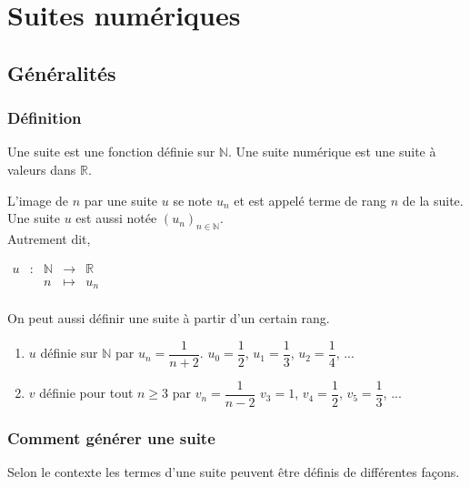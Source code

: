 \documentclass[french]{book}
\newcommand{\R}{\mathbb {R}}
\newcommand{\N}{\mathbb {N}}
\newcommand{\se}{\geq}
\newcommand{\suite}[1][u]{\left( #1_{n} \right)_{n\in\N}}
\begin{document}
\tableofcontents
\chapter{Suites numériques}

\section{Généralités}
\subsection{Définition}
\begin{defn}
Une suite est une fonction définie sur $\N$. Une suite numérique est une suite à valeurs dans $\R$.

 L'image de $n$ par une suite $u$ se note $u_{n}$ et est appelé terme de rang $n$ de la suite. Une suite $u$ est aussi notée $\suite[u]$.\\
 
Autrement dit, 
\begin{center}
$\begin{array}{ccccc}
u & : & \mathbb{N} & \to & \mathbb{R} \\
 & & n & \mapsto & u_n\\
\end{array}$
\end{center}
\end{defn}

\begin{rem}
On peut aussi définir une suite à partir d'un certain rang.
\end{rem}

\begin{exemple}
\begin{enumerate}
\item $u$ définie sur $\N$ par $u_{n}=\dfrac{1}{n+2}$.
\hspace{2em} $u_0=\dfrac{1}{2}$, $u_1=\dfrac{1}{3}$, $u_2=\dfrac{1}{4}$, ...
\item $v$ définie pour tout $n\se3$ par $v_{n}=\dfrac{1}{n-2}$
\hspace{2em} $v_3=1$, $v_4=\dfrac{1}{2}$, $v_5=\dfrac{1}{3}$, ...
\end{enumerate}
\end{exemple}


\subsection{Comment générer une suite}
Selon le contexte les termes d'une suite peuvent être définis de différentes façons.
\end{document}
